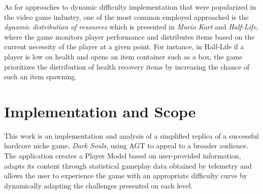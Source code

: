 As for approaches to dynamic difficulty implementation that were popularized in the video game industry, one of the most common employed approached is the \emph{dynamic distribution of resources} which is presented in \emph{Mario Kart} and \emph{Half-Life}, where the game monitors player performance and distributes items based on the current necessity of the player at a given point. For instance, in Half-Life if a player is low on health and opens an item container such as a box, the game prioritizes the distribution of health recovery items by increasing the chance of such an item spawning.






\section{Implementation and Scope}

This work is an implementation and analysis of a simplified replica of a successful hardcore niche game, \emph{Dark Souls}, using AGT to appeal to a broader audience. The application creates a Player Model based on user-provided information, adapts its content through statistical gameplay data obtained by telemetry and allows the user to experience the game with an appropriate difficulty curve by dynamically adapting the challenges presented on each level.

